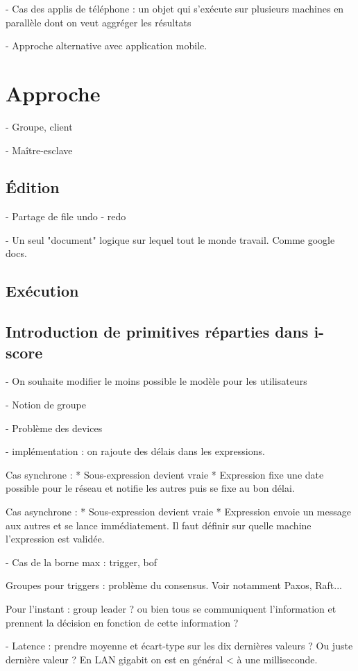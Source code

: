 \documentclass{article}
\begin{document}
- Cas des applis de téléphone : un objet qui s'exécute sur plusieurs machines en parallèle dont on veut aggréger les résultats

- Approche alternative avec application mobile.

\section{Approche}
- Groupe, client

- Maître-esclave
\subsection{Édition}
- Partage de file undo - redo

- Un seul "document" logique sur lequel tout le monde travail. Comme google docs.

\subsection{Exécution}

\subsection{Introduction de primitives réparties dans i-score}
- On souhaite modifier le moins possible le modèle pour les utilisateurs

- Notion de groupe

- Problème des devices

- implémentation : on rajoute des délais dans les expressions.

Cas synchrone : 
* Sous-expression devient vraie
* Expression fixe une date possible pour le réseau et notifie les autres puis se fixe au bon délai.

Cas asynchrone : 
* Sous-expression devient vraie
* Expression envoie un message aux autres et se lance immédiatement.
Il faut définir sur quelle machine l'expression est validée.

- Cas de la borne max : trigger, bof

Groupes pour triggers : problème du consensus. Voir notamment Paxos, Raft... 

Pour l'instant : group leader ? ou bien tous se communiquent l'information et prennent la décision en fonction de cette information ?

- Latence : prendre moyenne et écart-type sur les dix dernières valeurs ? Ou juste dernière valeur ?
En LAN gigabit on est en général < à une milliseconde.
\end{document}

